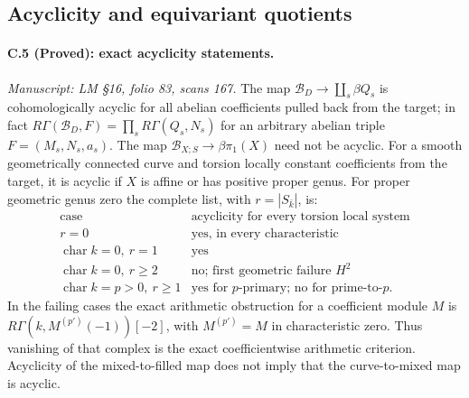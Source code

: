 \subsection{Acyclicity and equivariant quotients}

\paragraph{C.5 (Proved): exact acyclicity statements.}\label{C5}
\textit{Manuscript: LM \S16, folio 83, scans 167.}
The map $\mathcal B_D\to\coprod_s\beta Q_s$ is
cohomologically acyclic for all abelian
coefficients pulled back from the target; in
fact $R\Gamma(\mathcal B_D,F)=\prod_sR\Gamma(Q_s,N_s)$
for an arbitrary abelian triple $F=(M_s,N_s,a_s)$.
The map $\mathcal B_{X;S}\to\beta\pi_1(X)$ need
not be acyclic. For a smooth geometrically
connected curve and torsion locally constant
coefficients from the target, it is acyclic
if $X$ is affine or has positive proper genus.
For proper geometric genus zero the complete
list, with $r=|S_{\bar k}|$, is:
\[
\begin{array}{c|c}
 \text{case}&\text{acyclicity for every torsion local system}\\\hline
 r=0&\text{yes, in every characteristic}\\
 \operatorname{char}k=0,\ r=1&\text{yes}\\
 \operatorname{char}k=0,\ r\geq2&\text{no; first geometric failure }H^2\\
 \operatorname{char}k=p>0,\ r\geq1
       &\text{yes for }p\text{-primary; no for prime-to-}p.
\end{array}                                                     \tag{C.5.1}
\]
In the failing cases the exact arithmetic obstruction
for a coefficient module $M$ is
$R\Gamma(k,M^{(p')}(-1))[-2]$, with $M^{(p')}=M$
in characteristic zero. Thus vanishing of that
complex is the exact coefficientwise arithmetic
criterion. Acyclicity of the mixed-to-filled map
does not imply that the curve-to-mixed map is
acyclic.

